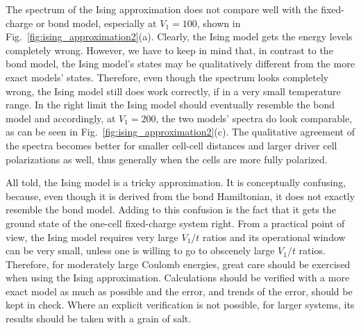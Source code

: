The spectrum of the Ising approximation does not compare well with the fixed-charge
or bond model, especially at $V_1 = 100$, shown in
Fig.~\ref{fig:ising_approximation2}(a). Clearly, the Ising model gets the energy
levels completely wrong. However, we have to keep in mind that, in contrast to
the bond model, the Ising model's states may be qualitatively different from the
more exact models' states. Therefore, even though the spectrum looks completely
wrong, the Ising model still does work correctly, if in a very small temperature
range. In the right limit the Ising model should eventually resemble the bond
model and accordingly, at $V_1 = 200$, the two models' spectra do look
comparable, as can be seen in Fig.~\ref{fig:ising_approximation2}(c). The
qualitative agreement of the spectra becomes better for smaller cell-cell
distances and larger driver cell polarizations as well, thus generally when the
cells are more fully polarized.

All told, the Ising model is a tricky approximation. It is conceptually
confusing, because, even though it is derived from the bond Hamiltonian, it does
not exactly resemble the bond model. Adding to this confusion is the fact that
it gets the ground state of the one-cell fixed-charge system right. From a
practical point of view, the Ising model requires very large $V_1/t$ ratios and
its operational window can be very small, unless one is willing to go to
obscenely large $V_1/t$ ratios. Therefore, for moderately large Coulomb
energies, great care should be exercised when using the Ising approximation.
Calculations should be verified with a more exact model as much as possible and the
error, and trends of the error, should be kept in check. Where an explicit
verification is not possible, for larger systems, its results should be taken
with a grain of salt.

